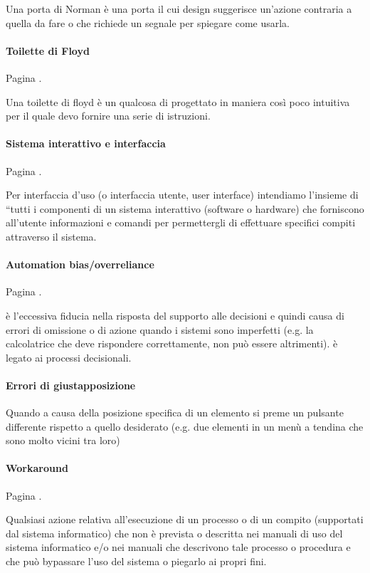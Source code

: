 \documentclass[11pt,a4paper]{book}
\begin{document}
Una porta di Norman è una porta il cui design suggerisce un'azione contraria a quella da fare o che richiede un segnale per spiegare come usarla.

\paragraph{Toilette di Floyd}
Pagina \pageref{par: toilette di Floyd}.

Una toilette di floyd è un qualcosa di progettato in maniera così poco intuitiva per il quale devo fornire una serie di istruzioni.

\paragraph{Sistema interattivo e interfaccia}
Pagina \pageref{par: sistema interattivo}.

Per interfaccia d'uso (o interfaccia utente, user interface) intendiamo l'insieme di “tutti i componenti di un sistema interattivo (software o hardware) che forniscono all'utente informazioni e comandi per permettergli di effettuare specifici compiti attraverso il sistema.

\paragraph{Automation bias/overreliance}
Pagina \pageref{par: automation bias}.

è l'eccessiva fiducia nella risposta del supporto alle decisioni e quindi causa di errori di omissione o di azione quando i sistemi sono imperfetti (e.g. la calcolatrice che deve rispondere correttamente, non può essere altrimenti). è legato ai processi decisionali.

\paragraph{Errori di giustapposizione}
Quando a causa della posizione specifica di un elemento si preme un pulsante differente rispetto a quello desiderato (e.g. due elementi in un menù a tendina che sono molto vicini tra loro)

\paragraph{Workaround}
Pagina \pageref{par: workaround}.

Qualsiasi azione relativa all'esecuzione di un processo o di un compito (supportati dal sistema informatico) che non è prevista o descritta nei manuali di uso del sistema informatico e/o nei manuali che descrivono tale processo o procedura e che può bypassare l'uso del sistema o piegarlo ai propri fini.
\end{document}
